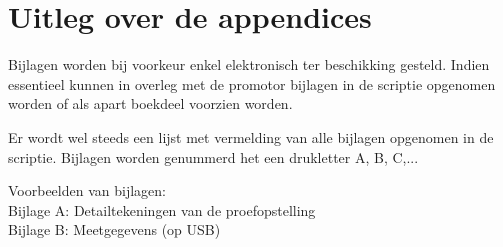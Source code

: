 \chapter{Uitleg over de appendices}
Bijlagen worden bij voorkeur enkel elektronisch ter beschikking gesteld. Indien essentieel kunnen in overleg met de promotor bijlagen in de scriptie opgenomen worden of als apart boekdeel voorzien worden.

Er wordt wel steeds een lijst met vermelding van alle bijlagen opgenomen in de scriptie. Bijlagen worden genummerd het een drukletter A, B, C,...

Voorbeelden van bijlagen:\\
Bijlage A: \qquad	Detailtekeningen van de proefopstelling \\
Bijlage B: \qquad	Meetgegevens (op USB)
\\



